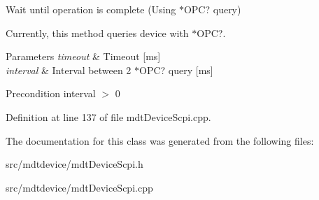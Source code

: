 Wait until operation is complete (Using $\ast$OPC? query) 

Currently, this method queries device with $\ast$OPC?.


\begin{DoxyParams}{Parameters}
{\em timeout} & Timeout \mbox{[}ms\mbox{]} \\
\hline
{\em interval} & Interval between 2 $\ast$OPC? query \mbox{[}ms\mbox{]} \\
\hline
\end{DoxyParams}
\begin{DoxyPrecond}{Precondition}
interval $>$ 0 
\end{DoxyPrecond}


Definition at line 137 of file mdtDeviceScpi.cpp.



The documentation for this class was generated from the following files:\begin{DoxyCompactItemize}
\item 
src/mdtdevice/mdtDeviceScpi.h\item 
src/mdtdevice/mdtDeviceScpi.cpp\end{DoxyCompactItemize}
